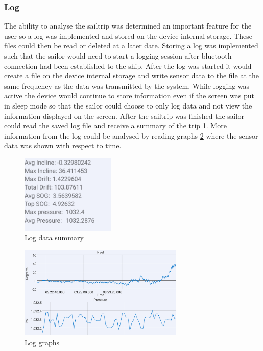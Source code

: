 \subsubsection{Log}
The ability to analyse the sailtrip was determined an important feature for the user so a log was implemented and stored on the device internal storage. These files could then be read or deleted at a later date. Storing a log was implemented such that the sailor would need to start a logging session after bluetooth connection had been established to the ship. After the log was started it would create a file on the device internal storage and write sensor data to the file at the same frequency as the data was transmitted by the system. While logging was active the device would continue to store information even if the screen was put in sleep mode so that the sailor could choose to only log data and not view the information displayed on the screen. After the sailtrip was finished the sailor could read the saved log file and receive a summary of the trip \ref{log-summary}. More information from the log could be analysed by reading graphs \ref{log-graph} where the sensor data was shown with respect to time.

\begin{figure}[H]
\centering
\includegraphics[width=0.4\textwidth]{Figures/log_data.png}
\caption{Log data summary}
\label{log-summary}
\end{figure}

\begin{figure}[H]
\centering
\includegraphics[width=0.7\textwidth]{Figures/log_graph.png}
\caption{Log graphs}
\label{log-graph}
\end{figure}

